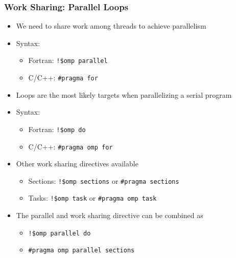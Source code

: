 \documentclass[c,mathserif,compress,xcolor=svgnames]{beamer}
\begin{document}
\begin{frame}
  \frametitle{\small Work Sharing: Parallel Loops}
  \begin{itemize}
    \item We need to share work among threads to achieve parallelism
    \item Syntax:
    \begin{itemize}
      \item Fortran: \texttt{!\$omp parallel}
      \item C/C++: \texttt{\#pragma for}
    \end{itemize}
    \item Loops are the most likely targets when parallelizing a serial program
    \item Syntax:
    \begin{itemize}
      \item Fortran: \texttt{!\$omp do}
      \item C/C++: \texttt{\#pragma omp for}
    \end{itemize}
    \item Other work sharing directives available
    \begin{itemize}
      \item Sections: \texttt{!\$omp sections} or \texttt{\#pragma sections} 
      \item Tasks: \texttt{!\$omp task} or \texttt{\#pragma omp task}
    \end{itemize}
    \item The parallel and work sharing directive can be combined as
    \begin{itemize}
      \item \texttt{!\$omp parallel do}
      \item \texttt{\#pragma omp parallel sections}
    \end{itemize}
  \end{itemize}
\end{frame}
\end{document}
